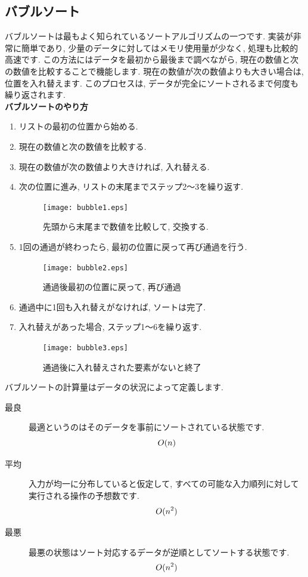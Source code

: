 \documentclass[a4j]{jarticle}
\begin{document}
\subsection{バブルソート}
バブルソートは最もよく知られているソートアルゴリズムの一つです. 実装が非常に簡単であり, 少量のデータに対してはメモリ使用量が少なく, 処理も比較的高速です. この方法にはデータを最初から最後まで調べながら, 現在の数値と次の数値を比較することで機能します. 現在の数値が次の数値よりも大きい場合は, 位置を入れ替えます. このプロセスは, データが完全にソートされるまで何度も繰り返されます.\\
\newpage
\textbf{バブルソートのやり方}
\begin{enumerate}
  \item リストの最初の位置から始める. 
  \item 現在の数値と次の数値を比較する. 
  \item 現在の数値が次の数値より大きければ, 入れ替える. 
  \item 次の位置に進み, リストの末尾までステップ2〜3を繰り返す. 
  \begin{figure}[H]
    \centering
    \texttt{[image: bubble1.eps]}
    \caption{先頭から末尾まで数値を比較して, 交換する. }
  \end{figure}
  \item 1回の通過が終わったら, 最初の位置に戻って再び通過を行う. 
  \begin{figure}[H]
    \centering
    \texttt{[image: bubble2.eps]}
    \caption{通過後最初の位置に戻って, 再び通過}
  \end{figure}
  \item 通過中に1回も入れ替えがなければ, ソートは完了. 
  \item 入れ替えがあった場合, ステップ1〜6を繰り返す. 
  \begin{figure}[H]
    \centering
    \texttt{[image: bubble3.eps]}
    \caption{通過後に入れ替えされた要素がないと終了}
  \end{figure}
\end{enumerate}
バブルソートの計算量はデータの状況によって定義します. \\
\begin{description}
  \item[最良] 最適というのはそのデータを事前にソートされている状態です. 
  \begin{equation}
    \centering
    O(n)
  \end{equation}
  \item[平均] 入力が均一に分布していると仮定して, すべての可能な入力順列に対して実行される操作の予想数です. 
  \begin{equation}
    \centering
    O(n^2)
  \end{equation}
  \item[最悪] 最悪の状態はソート対応するデータが逆順としてソートする状態です. 
  \begin{equation}
    \centering
    O(n^2)
  \end{equation}
\end{description}
\end{document}
